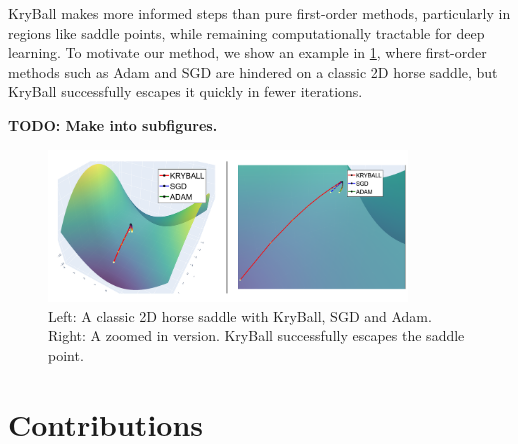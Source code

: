 KryBall makes more informed steps than pure first-order methods, particularly in regions like saddle points, while remaining computationally tractable for deep learning. To motivate our method, we show an example in \cref{fig:toy_example}, where first-order methods such as Adam and SGD are hindered on a classic 2D horse saddle, but KryBall successfully escapes it quickly in fewer iterations.

\textbf{TODO: Make into subfigures.}

\begin{figure}[h]
  \centering
    \includegraphics[width=0.85\textwidth]{figures/0intro/intro_toy.png}
    \caption{Left: A classic 2D horse saddle with KryBall, SGD and Adam. Right: A zoomed in version. KryBall successfully escapes the saddle point.}
    \label{fig:toy_example}
\end{figure}

\section{Contributions}
\label{sec:contributions}


